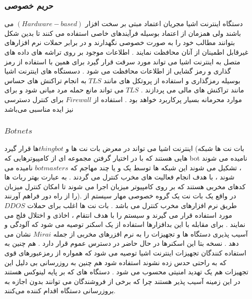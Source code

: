 \documentclass[aimcpersian]{aimc46}
\begin{document}
\subsubsection{حریم خصوصی }

دستگاه اینترنت اشیا مجریان اعتماد مبتی بر سخت افزار $(Hardware-based)$ می باشند ولی همزمان از اعتماد بوسیله فرآیندهای خاصی استفاده می کنند تا بدین شکل بتوانند مطالب خود را به صورت خصوصی نگهدارند و در برابر حملات نرم افزارهای غیرقابل اطمینان از آنان محافظت نمایند .
اطلاعات موجود بر روی تراشه های داده های متصل به اینترنت اشیا می تواند مورد سرقت قرار گیرد برای همین با استفاده از رمز گذاری و رمز گشایی از اطلاعات محافظت می شود . دسستگاه های اینترنت اشیا بوسیله رمزگذاری و استفاده از پروتکل های مانند $TLS$ به انجام تراکنش های حساس مانند تراکنش های مالی می پردازند . $TLS$ می تواند مانع حمله مرد میانی شود و برای موارد محرمانه بسیار پرکاربرد خواهد بود . استفاده از $Firewall$ برای کنترل دسترسی نیز ایده مناسبی می‌باشد 

\subsubsection{$Botnets$}
اینترنت اشیا می تواند در معرض بات نت ها و  $thingbot$ها قرار گیرد (بات نت ها شبکه هایی هستند که با در اختیار گرفتن مجموعه ای از کامپیوترهایی که bot نامیده می شوند ، تشکیل می شوند این شبکه ها توسط یک و یا چند مهاجم که $botmasters$ نامیده می شوند ، با هدف انجام فعالیت های مخرب کنترل می گردند . به عبارت بهتر ربات ها کدهای مخربی هستند که بر روی کامپیوتر میزبان اجرا می شوند تا امکان کنترل میزبان را از راه دور فراهم آورنند). در واقع یک بات نت یک گروه خصوصی مهار سیستم از طریق نرم افزارهای مخرب کنترل می باشد . بات نت ها اغلب برای حملات $DDOS$ مورد استفاده قرار می گیرند و سیستم را با هدف انتقام ، اخاذی و اختلال فلج می نمایند . برای مقابله با این بدافزارها استفاده از یک اسکنر توصیه می شود که آلودگی و آسیب پذیری دستگاه ها و تجهیزات را به نرم افزرهای مخربی از جمله $Mirai$ نشان می دهد . نسخه بتا این اسکنرها در حال حاضر در دسترس عموم قرار دارد . هم چنین به استفاده کنندگان تجهیزات اینترنت اشیا توصیه می شود که همواره  از رمزعبورهای قوی که به راحتی حدس زده نشوند استفاده شود هم چنین به روزرسانی بی دلیل این تجهیزات هم یک تهدید امنیتی محسوب می شود . دستگاه های که بر پایه لینوکس هستند در این زمینه آسیب پذیر هستند چرا که برخی از فروشندگان می توانند بدون اجازه به بروزرسانی دستگاه اقدام کننده می‌کنند.
\end{document}
